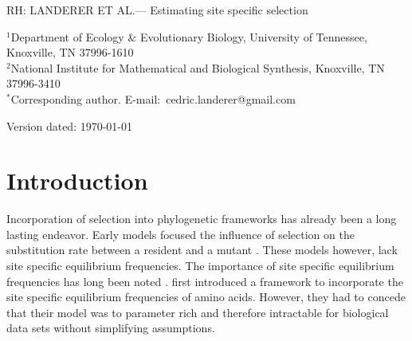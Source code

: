 \documentclass[12pt]{article}
\begin{document}
\doublespacing
\linenumbers

\newcommand{\Lik}{\ensuremath{\mathcal{L}}\xspace}
\newcommand{\selac}{\emph{SelAC}\xspace}
\newcommand{\phydms}{\emph{phydms}\xspace}
\newcommand{\gy}{\emph{GY94}\xspace}


\newcommand{\beginsupplement}{%
  \setcounter{section}{19} %
  \setcounter{page}{1}
  \renewcommand{\thepage}{S\arabic{page}} %

  \setcounter{table}{0}
  \renewcommand{\thetable}{S\arabic{table}}%
  \setcounter{figure}{0}
  \renewcommand{\thefigure}{S\arabic{figure}}%
}


\noindent RH: LANDERER ET AL.--- Estimating site specific selection
\bigskip
\medskip
\begin{center}

\bigskip


\end{center}

\vfill

{\small
\noindent$^{1}$Department of Ecology \& Evolutionary Biology, University of Tennessee, Knoxville, TN 37996-1610\\
\noindent$^{2}$National Institute for Mathematical and Biological Synthesis, Knoxville, TN 37996-3410\\
\noindent$^{*}$Corresponding author. E-mail:~cedric.landerer@gmail.com
}

\vfill
\centerline{Version dated: \today}
\vfill
\newpage




\section*{Introduction}

Incorporation of selection into phylogenetic frameworks has already been a long lasting endeavor.
Early models focused the influence of selection on the substitution rate between a resident and a mutant \citep{GoldmanAndYang1994, MuseAndGaut1994, thorne1996}.
These models however, lack site specific equilibrium frequencies.
The importance of site specific equilibrium frequencies has long been noted \citep{felsenstein1981, gojobori1983}.
\citet{HalpernAndBruno1998} first introduced a framework to incorporate the site specific equilibrium frequencies of amino acids.
However, they had to concede that their model was to parameter rich and therefore intractable for biological data sets without simplifying assumptions.
\end{document}
